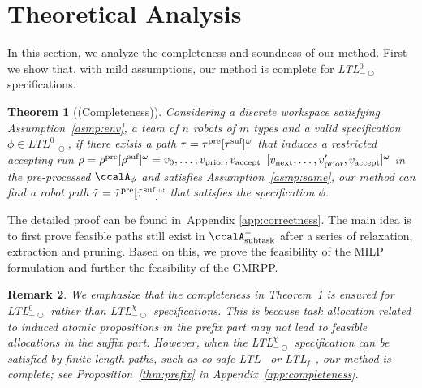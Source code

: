\documentclass[Afour,sageh,times]{sagej}
\makeatletter
\newtheorem{thm}{Theorem}[section]
\newtheorem{rem}[thm]{Remark}
\newcommand{\ltlx}{ {\it LTL}$_{-\bigcirc}^\chi$ }
\newcommand{\ltlz}{ {\it LTL}$_{-\bigcirc}^0$ }
\newcommand{\auto}[1]{\ccalA_{\textup{#1}}}
\newcommand{\autop}{\ccalA_{\phi}}
\newcommand{\vertex}[1]{v_{\textup{#1}}}
\newcommand{\scriptveryshortarrow}[1][3pt]{{%
    \hbox{\rule[\scriptratio\dimexpr\fontdimen22\textfont2-.2pt\relax]
               {\scriptratio\dimexpr#1\relax}{\scriptratio\dimexpr.4pt\relax}}%
   \mkern-4mu\hbox{\let\f@size\sf@size\usefont{U}{lasy}{m}{n}\symbol{41}}}}
\makeatother
\begin{document}
{{\section{Theoretical Analysis}\label{sec:correctness}
In this section, we analyze the completeness and soundness of our method. First we show that, with mild assumptions, our method is complete for \ltlz specifications.
\begin{thm}[(Completeness)]\label{thm:completeness}
  Considering  a discrete workspace  satisfying Assumption~\ref{asmp:env}, a team of $n$ robots of $m$ types and a valid specification $\phi\in \textit{LTL}_{-\bigcirc}^0$, if there exists a path $\tau = \tau^\textup{pre} [\tau^\textup{suf}]^\omega$ that induces a restricted accepting run $\rho = \rho^\textup{pre} [\rho^\textup{suf}]^\omega =  v_0, \ldots, \vertex{prior}, \vertex{accept}$ $ [\vertex{next}, \ldots, \vertex{prior}', \vertex{accept}]^\omega$ in the pre-processed $\autop$ and satisfies  Assumption~\ref{asmp:same}, our method can find a  robot path $\tilde{\tau}=\tilde{\tau}^{\textup{pre}} [\tilde{\tau}^{\textup{suf}}]^\omega$ that satisfies the specification $\phi$.
\end{thm}

The detailed proof can be found in~Appendix \ref{app:correctness}. The main idea is to first prove feasible paths still exist in $\auto{subtask}^-$ after a series of relaxation, extraction and pruning. Based on this, we prove the feasibility of the MILP formulation and further the feasibility of the GMRPP.

\begin{rem}
  We emphasize that the completeness in Theorem~\ref{thm:completeness} is ensured for \ltlz rather than \ltlx specifications. This is because  task allocation related to induced atomic propositions in the prefix part may not lead to feasible allocations  in the suffix part. However, when the \ltlx specification can be satisfied by finite-length paths, such as co-safe LTL~\textup{\citep{kupferman2001model}} or LTL$_f$ \textup{\citep{de2013linear}}, our method is complete; see Proposition~\ref{thm:prefix} in Appendix~\ref{app:completeness}.
\end{rem}

}}
\end{document}
